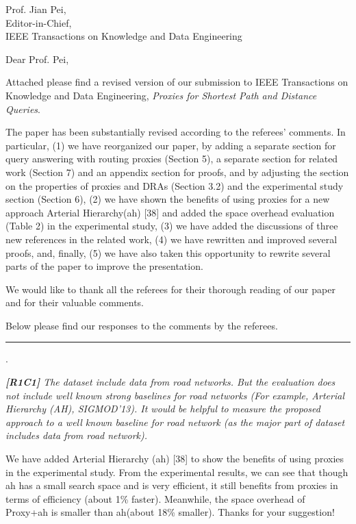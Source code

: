 \documentclass[11pt]{letter}
\date{}
\newcommand{\svs}{\vspace{0.36ex}}
\newcommand{\stitle}[1]{\vspace{0.5ex} \noindent{\bf #1}}
\newcommand{\ah}{{\sc ah}\xspace}
\begin{document}
\noindent
Prof. Jian Pei,\\
Editor-in-Chief,\\
IEEE Transactions on Knowledge and Data Engineering

\vspace{0.3cm}
\noindent
Dear Prof. Pei,


Attached please find a revised version of our submission to IEEE Transactions on Knowledge and Data Engineering,
{\em Proxies for Shortest Path and Distance Queries}.

The paper has been substantially revised according to the referees' comments. In particular,
%
(1) we have reorganized our paper, by adding a separate section for query answering with routing proxies (Section 5), a separate section for related work (Section 7) and an appendix section for proofs, and by adjusting the section on the properties of proxies and DRAs (Section 3.2) and the experimental study section (Section 6),
%
(2) we have shown the benefits of using proxies for a new approach Arterial Hierarchy(\ah) [38] and added the space overhead evaluation (Table 2) in the experimental study,
%
(3) we have added the discussions of three new references in the related work,
%
(4) we have rewritten and improved several proofs, and, finally,
%
(5) we have also taken this opportunity to rewrite several parts of the paper to improve the presentation.



We would like to thank all the referees for their thorough reading of our
paper and for their valuable comments.

Below please find our responses to the comments by the referees.

\vspace{3.6ex}
\hrule
\vspace{0.6ex}

\vspace{2ex} \stitle{Response to the comments of Referee 1}.

{\em
{\bf [R1C1]} The dataset include data from road networks. But the evaluation does not include well known strong baselines for road networks (For example, Arterial Hierarchy (AH), SIGMOD'13).
It would be helpful to measure the proposed approach to a well known baseline for road network (as the major part of dataset includes data from road network).}
\svs

We have added Arterial Hierarchy (\ah) [38] to show the benefits of using proxies in the experimental study.  From the experimental results, we can see that though \ah has a small search space and is very efficient, it still benefits from proxies in terms of efficiency (about 1\% faster). Meanwhile, the space overhead of Proxy+\ah is smaller than \ah (about 18\% smaller). Thanks for your suggestion!
\end{document}
